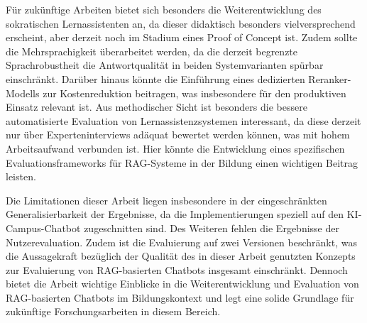 Für zukünftige Arbeiten bietet sich besonders die Weiterentwicklung des sokratischen Lernassistenten an, da dieser didaktisch besonders vielversprechend erscheint, aber derzeit noch im Stadium eines Proof of Concept ist.
Zudem sollte die Mehrsprachigkeit überarbeitet werden, da die derzeit begrenzte Sprachrobustheit die Antwortqualität in beiden Systemvarianten spürbar einschränkt.
Darüber hinaus könnte die Einführung eines dedizierten Reranker-Modells zur Kostenreduktion beitragen, was insbesondere für den produktiven Einsatz relevant ist.
Aus methodischer Sicht ist besonders die bessere automatisierte Evaluation von Lernassistenzsystemen interessant, da diese derzeit nur über Experteninterviews adäquat bewertet werden können, was mit hohem Arbeitsaufwand verbunden ist.
Hier könnte die Entwicklung eines spezifischen Evaluationsframeworks für RAG-Systeme in der Bildung einen wichtigen Beitrag leisten.

Die Limitationen dieser Arbeit liegen insbesondere in der eingeschränkten Generalisierbarkeit der Ergebnisse, da die Implementierungen speziell auf den KI-Campus-Chatbot zugeschnitten sind.
Des Weiteren fehlen die Ergebnisse der Nutzerevaluation.
Zudem ist die Evaluierung auf zwei Versionen beschränkt, was die Aussagekraft bezüglich der Qualität des in dieser Arbeit genutzten Konzepts zur Evaluierung von RAG-basierten Chatbots insgesamt einschränkt.
Dennoch bietet die Arbeit wichtige Einblicke in die Weiterentwicklung und Evaluation von RAG-basierten Chatbots im Bildungskontext und legt eine solide Grundlage für zukünftige Forschungsarbeiten in diesem Bereich.